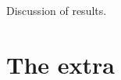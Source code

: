 \documentclass[a4paper,10pt,openright]{memoir}
\begin{document}
Discussion of results.



\cleardoublepage
\renewcommand{\sc}[1]{\textsc{#1}}
\nocite{*}




\cleardoublepage
\appendix

\renewcommand{\thesection}{\thechapter\arabic{section}}

\chapter{The extra}


\newpage ~
\thispagestyle{empty}
\end{document}
